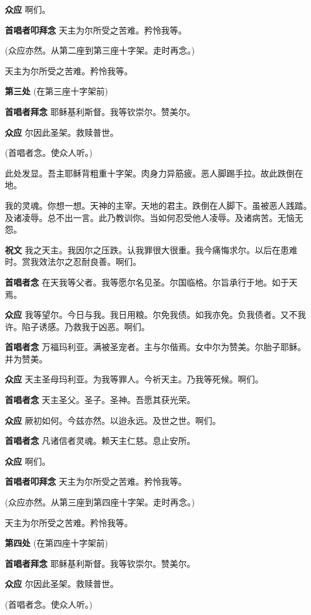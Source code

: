 \documentclass[UTF8,17pt]{ctexart}
\begin{document}
\textbf{众应} \quad 啊们。


\textbf{⾸唱者叩拜念} \quad 天主为尔所受之苦难。矜怜我等。

(众应亦然。从第二座到第三座⼗字架。⾛时再念。)

天主为尔所受之苦难。矜怜我等。

\textbf{第三处} (在第三座⼗字架前)

\textbf{⾸唱者拜念} \quad 耶稣基利斯督。我等钦崇尔。赞美尔。

\textbf{众应} \quad 尔因此圣架。救赎普世。

(⾸唱者念。使众⼈听。)

此处发显。吾主耶稣背粗重⼗字架。⾁⾝⼒异筋疲。恶⼈脚踢⼿拉。故此跌倒在地。

我的灵魂。你想⼀想。天神的主宰。天地的君主。跌倒在⼈脚下。虽被恶⼈践踏。及诸凌辱。总不出⼀⾔。此乃教训你。当如何忍受他⼈凌辱。及诸病苦。⽆恼⽆怨。

\textbf{祝⽂} \quad 我之天主。我因尔之压跌。认我罪很⼤很重。我今痛悔求尔。以后在患难时。赏我效法尔之忍耐良善。啊们。

\textbf{⾸唱者念} \quad 在天我等⽗者。我等愿尔名见圣。尔国临格。尔旨承⾏于地。如于天焉。

\textbf{众应} \quad 我等望尔。今⽇与我。我⽇⽤粮。尔免我债。如我亦免。负我债者。又不我许。陷⼦诱感。乃救我于凶恶。啊们。

\textbf{⾸唱者念} \quad 万福玛利亚。满被圣宠者。主与尔偕焉。⼥中尔为赞美。尔胎⼦耶稣。并为赞美。

\textbf{众应} \quad 天主圣母玛利亚。为我等罪⼈。今祈天主。乃我等死候。啊们。

\textbf{⾸唱者念} \quad 天主圣⽗。圣⼦。圣神。吾愿其获光荣。

\textbf{众应} \quad 厥初如何。今兹亦然。以迨永远。及世之世。啊们。

\textbf{⾸唱者念} \quad 凡诸信者灵魂。赖天主仁慈。息⽌安所。

\textbf{众应} \quad 啊们。


\textbf{⾸唱者叩拜念} \quad 天主为尔所受之苦难。矜怜我等。

(众应亦然。从第三座到第四座⼗字架。⾛时再念。)

天主为尔所受之苦难。矜怜我等。

\textbf{第四处} (在第四座⼗字架前)

\textbf{⾸唱者拜念} \quad 耶稣基利斯督。我等钦崇尔。赞美尔。

\textbf{众应} \quad 尔因此圣架。救赎普世。

(⾸唱者念。使众⼈听。)
\end{document}
